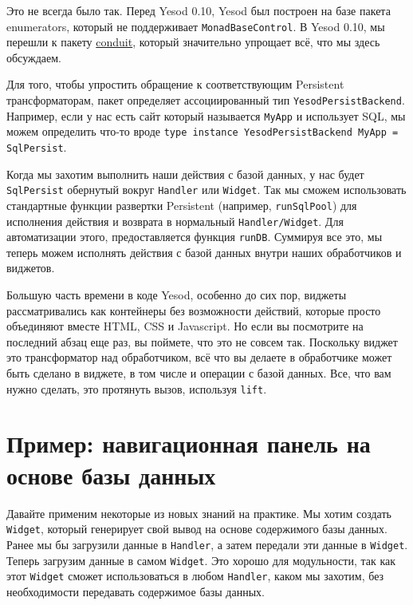 \begin{remark}
Это не всегда было так. Перед Yesod 0.10, Yesod был построен на базе пакета enumerators, 
который не поддерживает \lstinline'MonadBaseControl'. В Yesod 0.10, мы перешли к пакету 
\hyperref[chap:intro]{conduit},
который значительно упрощает всё, что мы здесь обсуждаем.
\end{remark}

Для того, чтобы упростить обращение к соответствующим Persistent трансформаторам, пакет 
 определяет
ассоциированный тип \lstinline'YesodPersistBackend'. Например, если у нас есть сайт
который называется \lstinline'MyApp' и использует SQL, мы можем определить что-то вроде 
\lstinline'type instance YesodPersistBackend MyApp = SqlPersist'.

Когда мы захотим выполнить наши действия с базой данных, у нас будет
\lstinline'SqlPersist' обернутый вокруг \lstinline'Handler' или \lstinline'Widget'. Так мы
сможем использовать стандартные функции развертки Persistent (например,
\lstinline'runSqlPool') для исполнения действия и возврата в нормальный
\lstinline'Handler/Widget'. Для автоматизации этого, предоставляется функция
\lstinline'runDB'. Суммируя все это, мы теперь можем исполнять действия с базой данных
внутри наших обработчиков и виджетов.

Большую часть времени в коде Yesod, особенно до сих пор, виджеты рассматривались как 
контейнеры без возможности действий, которые просто объединяют вместе HTML, CSS и
Javascript. Но если вы посмотрите на последний абзац еще раз, вы поймете, что это не
совсем так. Поскольку виджет это трансформатор над обработчиком, всё что вы делаете в
обработчике может быть сделано в виджете, в том числе и операции с базой данных. Все, что
вам нужно сделать, это протянуть вызов, используя \lstinline'lift'.

\section{Пример: навигационная панель на основе базы данных}

Давайте применим некоторые из новых знаний на практике. Мы хотим создать
\lstinline'Widget', который генерирует свой вывод на основе содержимого базы данных. Ранее
мы бы загрузили данные в \lstinline'Handler', а затем передали эти данные в
\lstinline'Widget'. Теперь загрузим данные в самом \lstinline'Widget'. Это хорошо для
модульности, так как этот \lstinline'Widget' сможет использоваться в любом
\lstinline'Handler', каком мы захотим, без необходимости передавать содержимое базы
данных.

